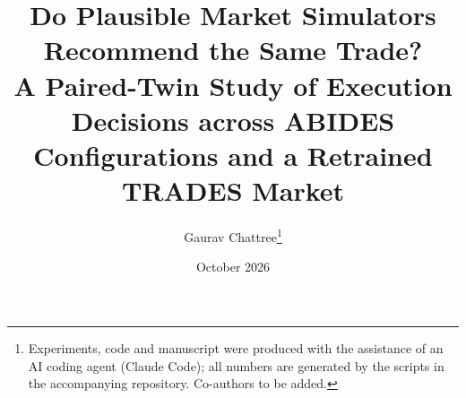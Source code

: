 \documentclass[11pt]{article}
\title{Do Plausible Market Simulators Recommend the Same Trade?\\[4pt]
\large A Paired-Twin Study of Execution Decisions across ABIDES Configurations and a Retrained TRADES Market}
\author{Gaurav Chattree\thanks{Experiments, code and manuscript were produced with the assistance of an AI coding agent (Claude Code); all numbers are generated by the scripts in the accompanying repository. Co-authors to be added.}}
\date{October 2026}
\begin{document}
\maketitle

\begin{abstract}

\end{abstract}







\appendix

\end{document}
